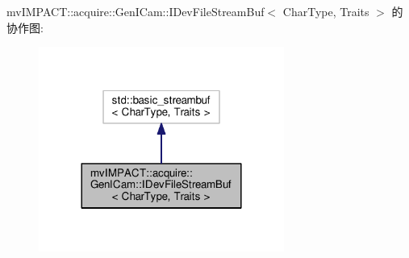 mv\+I\+M\+P\+A\+C\+T\+:\+:acquire\+:\+:Gen\+I\+Cam\+:\+:I\+Dev\+File\+Stream\+Buf$<$ Char\+Type, Traits $>$ 的协作图\+:
\nopagebreak
\begin{figure}[H]
\begin{center}
\leavevmode
\includegraphics[width=228pt]{classmv_i_m_p_a_c_t_1_1acquire_1_1_gen_i_cam_1_1_i_dev_file_stream_buf__coll__graph}
\end{center}
\end{figure}
